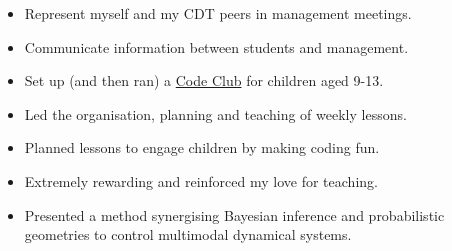 \documentclass[10pt,a4paper,ragged2e,withhyper]{altacv}
\begin{document}
\begin{paracol}{2}

\label{sec:orgf33b97b}

\begin{itemize}
\item Represent myself and my CDT peers in management meetings.
\item Communicate information between students and management.
\end{itemize}


\par\divider
{}

\begin{itemize}
\item Set up (and then ran) a \href{https://codeclub.org/en/}{Code Club} for children aged 9-13.
\item Led the organisation, planning and teaching of weekly lessons.
\item Planned lessons to engage children by making coding fun.
\item Extremely rewarding and reinforced my love for teaching.
\end{itemize}


\label{sec:org06eeef6}

\begin{itemize}
\item Presented a method synergising Bayesian inference and probabilistic geometries to control multimodal dynamical systems.
\end{itemize}

\switchcolumn

\label{sec:org02d48d0}

\divider


\end{paracol}
\end{document}
